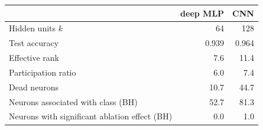 \begin{tabular}{lrr}\toprule
 & deep MLP & CNN\\\midrule
Hidden units $k$ & 64 & 128\\
Test accuracy & 0.939 & 0.964\\
Effective rank & 7.6 & 11.4\\
Participation ratio & 6.0 & 7.4\\
Dead neurons & 10.7 & 44.7\\
Neurons associated with class (BH) & 52.7 & 81.3\\
Neurons with significant ablation effect (BH) & 0.0 & 1.0\\
\bottomrule\end{tabular}
